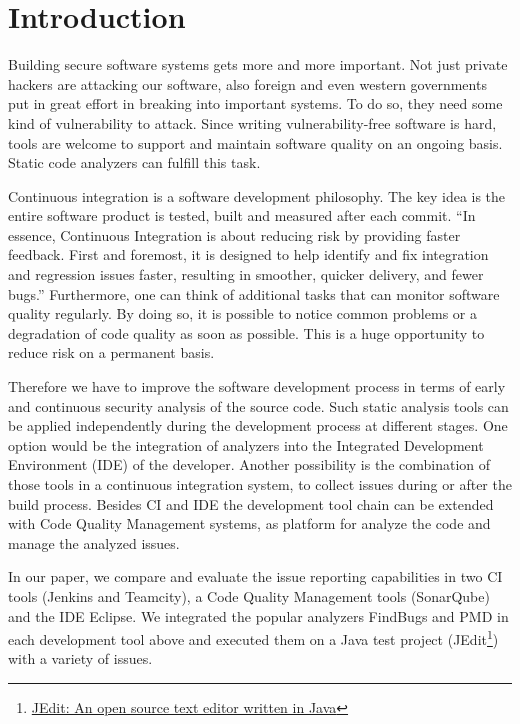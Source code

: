 \documentclass[conference]{IEEEtran}
\begin{document}
\section{Introduction}
Building secure software systems gets more and more important. Not just private hackers are attacking our software, also foreign and even western governments put in great effort in breaking into important systems\cite{NSAHacking}. To do so, they need some kind of vulnerability to attack. Since writing vulnerability-free software is hard, tools are welcome to support and maintain software quality on an ongoing basis. Static code analyzers can fulfill this task.


Continuous integration is a software development philosophy. The key idea is the entire software product is tested, built and measured after each commit. ``In essence, Continuous Integration is about reducing risk by providing faster feedback. First and foremost, it is designed to help identify and fix integration and regression issues faster, resulting in smoother, quicker delivery, and fewer bugs.''\cite{Jenkins:Smart:2011} Furthermore, one can think of additional tasks that can monitor software quality regularly. By doing so, it is possible to notice common problems or a degradation of code quality as soon as possible. This is a huge opportunity to reduce risk on a permanent basis.


Therefore we have to improve the software development process in terms of early and continuous security analysis of the source code.
Such static analysis tools can be applied independently during the development process at different stages.
One option would be the integration of analyzers into the Integrated Development Environment (IDE) of the developer.
Another possibility is the combination of those tools in a continuous integration system, to collect issues during or after the build process.
Besides CI and IDE the development tool chain can be extended with Code Quality Management systems, as platform for analyze the code and manage the analyzed issues.


In our paper, we compare and evaluate the issue reporting capabilities in two CI tools (Jenkins and Teamcity), a Code Quality Management tools (SonarQube) and the IDE Eclipse.
We integrated the popular analyzers FindBugs and PMD in each development tool above and executed them on a Java test project (JEdit\footnote{\href{http://www.jedit.org/}{JEdit: An open source text editor written in Java}}) with a variety of issues.
\end{document}
